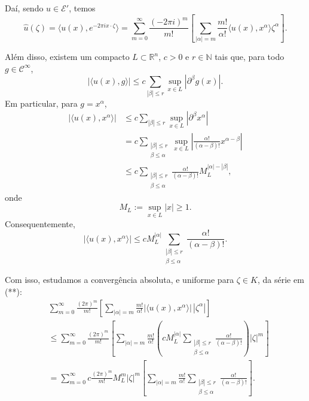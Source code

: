 \documentclass[../distribution_theory_notes.tex]{subfiles}
\begin{document}
\begin{proof*}
	Daí, sendo \(u\in\mathcal{E}'\), temos
	\[
		\hat u(\zeta)=\langle u(x),e^{-2\pi i x\cdot\zeta}\rangle
		=\sum_{m=0}^\infty\frac{(-2\pi i)^m}{m!}
		\left[
			\sum_{|\alpha|=m}\frac{m!}{\alpha!}\langle u(x),x^\alpha\rangle\zeta^\alpha
			\right].\tag{**}
	\]

	Além disso, existem um compacto \(L\subset\mathbb{R}^n\), \(c>0\) e \(r\in\mathbb{N}\) tais que, para todo \(g\in\mathcal{C}^\infty\),
	\[
		|\langle u(x),g\rangle|
		\leq c\sum_{|\beta|\leq r}\sup_{x\in L}|\partial^\beta g(x)|.
	\]
	Em particular, para \(g=x^\alpha\),
	\begin{align*}
		|\langle u(x),x^\alpha\rangle|
		 & \leq c\sum_{|\beta|\leq r}\sup_{x\in L}|\partial^\beta x^\alpha|       \\
		 & =c\sum_{\substack{|\beta|\leq r                                        \\ \beta\leq\alpha}}
		\sup_{x\in L}\left|\frac{\alpha!}{(\alpha-\beta)!}x^{\alpha-\beta}\right| \\
		 & \leq c\sum_{\substack{|\beta|\leq r                                    \\ \beta\leq\alpha}}
		\frac{\alpha!}{(\alpha-\beta)!}M_L^{|\alpha|-|\beta|},
	\end{align*}
	onde
	\[
		M_L:=\sup_{x\in L}|x|\geq1.
	\]
	Consequentemente,
	\[
		|\langle u(x),x^\alpha\rangle|
		\leq cM_L^{|\alpha|}
		\sum_{\substack{|\beta|\leq r\\ \beta\leq\alpha}}
		\frac{\alpha!}{(\alpha-\beta)!}.
	\]

	Com isso, estudamos a convergência absoluta, e uniforme para \(\zeta\in K\), da série em (**):
	\begin{align*}
		 & \sum_{m=0}^\infty\frac{(2\pi)^m}{m!}
		\left[
			\sum_{|\alpha|=m}\frac{m!}{\alpha!}
			|\langle u(x),x^\alpha\rangle|\,|\zeta^\alpha|
		\right]                                                  \\
		 & \leq \sum_{m=0}^\infty\frac{(2\pi)^m}{m!}
		\left[
			\sum_{|\alpha|=m}\frac{m!}{\alpha!}
			\left(cM_L^{|\alpha|}
		\sum_{\substack{|\beta|\leq r                            \\ \beta\leq\alpha}}
			\frac{\alpha!}{(\alpha-\beta)!}\right)|\zeta|^m
		\right]                                                  \\
		 & =\sum_{m=0}^\infty c\frac{(2\pi)^m}{m!}M_L^m|\zeta|^m
		\left[
			\sum_{|\alpha|=m}\frac{m!}{\alpha!}
		\sum_{\substack{|\beta|\leq r                            \\ \beta\leq\alpha}}
			\frac{\alpha!}{(\alpha-\beta)!}
			\right].\tag{***}
	\end{align*}


\end{proof*}
\end{document}
